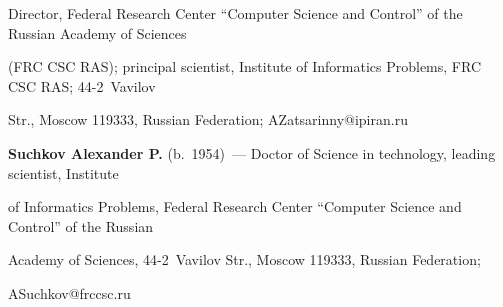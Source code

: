 Director, Federal Research Center ``Computer Science and Control'' of the Russian Academy of Sciences 

(FRC CSC RAS); principal scientist, Institute of Informatics Problems, FRC CSC RAS; 44-2~Vavilov 

Str., Moscow 119333, Russian Federation; \mbox{AZatsarinny@ipiran.ru}



\vspace*{3pt}



\noindent

\textbf{Suchkov Alexander P.} (b.\ 1954)~--- Doctor of Science in technology, leading scientist, Institute 

of Informatics Problems, Federal Research Center ``Computer Science and Control'' of the Russian 

Academy of Sciences, 44-2~Vavilov Str., Moscow 119333, Russian Federation; 

\mbox{ASuchkov@frccsc.ru}





\label{end\stat}



\renewcommand{\bibname}{\protect\rm Литература} 

